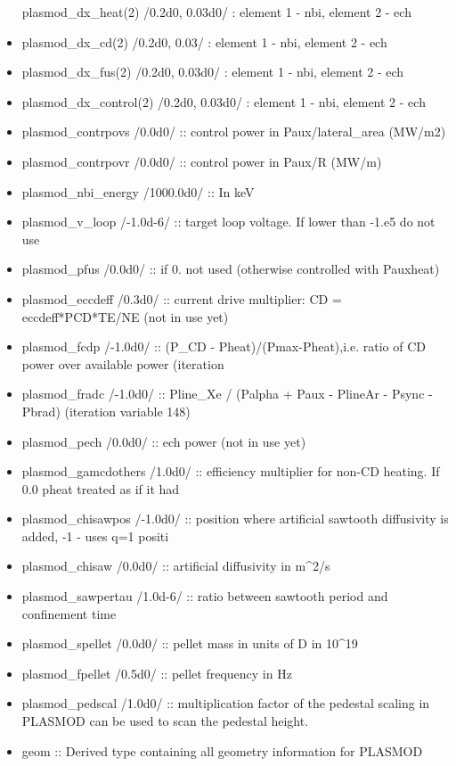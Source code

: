 \documentclass[]{article}
\begin{document}
\begin{itemize}
  plasmod\_dx\_heat(2) /0.2d0, 0.03d0/ : element 1 - nbi, element 2 -
  ech
\item
  plasmod\_dx\_cd(2) /0.2d0, 0.03/ : element 1 - nbi, element 2 - ech
\item
  plasmod\_dx\_fus(2) /0.2d0, 0.03d0/ : element 1 - nbi, element 2 - ech
\item
  plasmod\_dx\_control(2) /0.2d0, 0.03d0/ : element 1 - nbi, element 2 -
  ech
\item
  plasmod\_contrpovs /0.0d0/ :: control power in Paux/lateral\_area
  (MW/m2)
\item
  plasmod\_contrpovr /0.0d0/ :: control power in Paux/R (MW/m)
\item
  plasmod\_nbi\_energy /1000.0d0/ :: In keV
\item
  plasmod\_v\_loop /-1.0d-6/ :: target loop voltage. If lower than -1.e5
  do not use
\item
  plasmod\_pfus /0.0d0/ :: if 0. not used (otherwise controlled with
  Pauxheat)
\item
  plasmod\_eccdeff /0.3d0/ :: current drive multiplier: CD =
  eccdeff*PCD*TE/NE (not in use yet)
\item
  plasmod\_fcdp /-1.0d0/ :: (P\_CD - Pheat)/(Pmax-Pheat),i.e. ratio of
  CD power over available power (iteration
\item
  plasmod\_fradc /-1.0d0/ :: Pline\_Xe / (Palpha + Paux - PlineAr -
  Psync - Pbrad) (iteration variable 148)
\item
  plasmod\_pech /0.0d0/ :: ech power (not in use yet)
\item
  plasmod\_gamcdothers /1.0d0/ :: efficiency multiplier for non-CD
  heating. If 0.0 pheat treated as if it had
\item
  plasmod\_chisawpos /-1.0d0/ :: position where artificial sawtooth
  diffusivity is added, -1 - uses q=1 positi
\item
  plasmod\_chisaw /0.0d0/ :: artificial diffusivity in m\^{}2/s
\item
  plasmod\_sawpertau /1.0d-6/ :: ratio between sawtooth period and
  confinement time
\item
  plasmod\_spellet /0.0d0/ :: pellet mass in units of D in 10\^{}19
\item
  plasmod\_fpellet /0.5d0/ :: pellet frequency in Hz
\item
  plasmod\_pedscal /1.0d0/ :: multiplication factor of the pedestal
  scaling in PLASMOD can be used to scan the pedestal height.
\item
  geom :: Derived type containing all geometry information for PLASMOD

\end{itemize}
\end{document}
